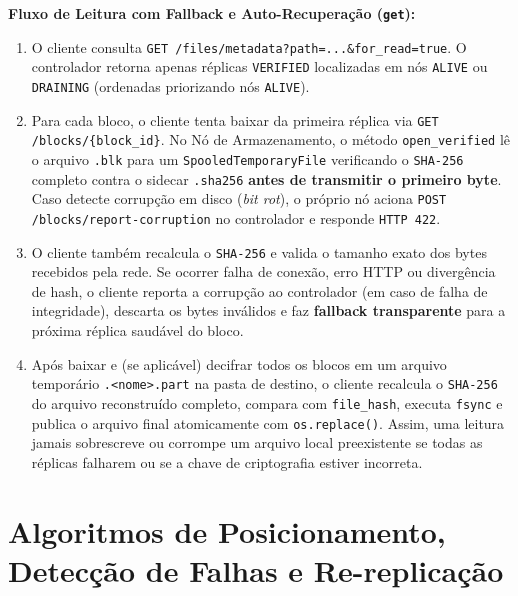 \documentclass[10pt,a4paper]{article}
\begin{document}
\textbf{Fluxo de Leitura com Fallback e Auto-Recuperação (\texttt{get}):}
\begin{enumerate}
    \item O cliente consulta \texttt{GET /files/metadata?path=...\&for\_read=true}. O controlador retorna apenas réplicas \texttt{VERIFIED} localizadas em nós \texttt{ALIVE} ou \texttt{DRAINING} (ordenadas priorizando nós \texttt{ALIVE}).
    \item Para cada bloco, o cliente tenta baixar da primeira réplica via \texttt{GET /blocks/\{block\_id\}}. No Nó de Armazenamento, o método \texttt{open\_verified} lê o arquivo \texttt{.blk} para um \texttt{SpooledTemporaryFile} verificando o \texttt{SHA-256} completo contra o sidecar \texttt{.sha256} \textbf{antes de transmitir o primeiro byte}. Caso detecte corrupção em disco (\textit{bit rot}), o próprio nó aciona \texttt{POST /blocks/report-corruption} no controlador e responde \texttt{HTTP 422}.
    \item O cliente também recalcula o \texttt{SHA-256} e valida o tamanho exato dos bytes recebidos pela rede. Se ocorrer falha de conexão, erro HTTP ou divergência de hash, o cliente reporta a corrupção ao controlador (em caso de falha de integridade), descarta os bytes inválidos e faz \textbf{fallback transparente} para a próxima réplica saudável do bloco.
    \item Após baixar e (se aplicável) decifrar todos os blocos em um arquivo temporário \texttt{.<nome>.part} na pasta de destino, o cliente recalcula o \texttt{SHA-256} do arquivo reconstruído completo, compara com \texttt{file\_hash}, executa \texttt{fsync} e publica o arquivo final atomicamente com \texttt{os.replace()}. Assim, uma leitura jamais sobrescreve ou corrompe um arquivo local preexistente se todas as réplicas falharem ou se a chave de criptografia estiver incorreta.
\end{enumerate}

\section{Algoritmos de Posicionamento, Detecção de Falhas e Re-replicação}
\end{document}

